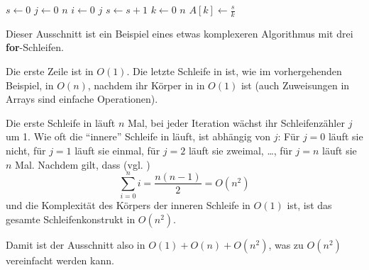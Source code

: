 \begin{codebox}
    \li $s \gets 0$                     \label{ln:ex3-setup}
    \li \For $j \gets 0$ \To $n$        \label{ln:ex3-outer-for}
    \li     \Do
                \For $i \gets 0$ \To $j$\label{ln:ex3-inner-for}
    \li             \Do
                        $s \gets s + 1$ \label{ln:ex3-inner-for-body}
                    \End
            \End
    \li \For $k \gets 0$ \To $n$        \label{ln:ex3-second-for}
    \li     \Do
                $A[k] \gets \frac{s}{k}$\label{ln:ex3-second-for-body}
            \End
\end{codebox}

Dieser Ausschnitt ist ein Beispiel eines etwas komplexeren Algorithmus mit drei \textbf{for}-Schleifen.

Die erste Zeile ist in $O(1)$. Die letzte Schleife in  ist, wie im vorhergehenden Beispiel, in $O(n)$, nachdem ihr Körper in  in $O(1)$ ist (auch Zuweisungen in Arrays sind einfache Operationen).

Die erste Schleife in  läuft $n$ Mal, bei jeder Iteration wächst ihr Schleifenzähler $j$ um 1. Wie oft die \enquote{innere} Schleife in  läuft, ist abhängig von $j$: Für $j = 0$ läuft sie nicht, für $j = 1$ läuft sie einmal, für $j = 2$ läuft sie zweimal, \ldots, für $j = n$ läuft sie $n$ Mal. Nachdem gilt, dass (vgl. \cite{cf2007})
\begin{equation*}
    \sum_{i = 0}^{n} i = \frac{n(n - 1)}{2} = O(n^2)
\end{equation*}
und die Komplexität des Körpers der inneren Schleife in $O(1)$ ist, ist das gesamte Schleifenkonstrukt in $O(n^2)$.

Damit ist der Ausschnitt also in $O(1) + O(n) + O(n^2)$, was zu $O(n^2)$ vereinfacht werden kann.

